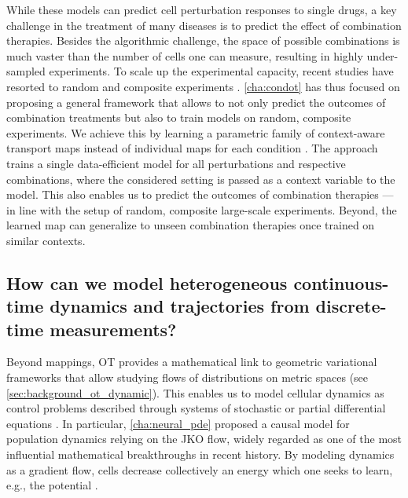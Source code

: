  While these models can predict cell perturbation responses to single drugs, a key challenge in the treatment of many diseases is to predict the effect of combination therapies. Besides the algorithmic challenge, the space of possible combinations is much vaster than the number of cells one can measure, resulting in highly under-sampled experiments. To scale up the experimental capacity, recent studies have resorted to random and composite experiments \citep{norman2019exploring, cleary2020necessity}.
\cref{cha:condot} has thus focused on proposing a general framework that allows to not only predict the outcomes of combination treatments but also to train models on random, composite experiments.
We achieve this by learning a parametric family of context-aware transport maps instead of individual maps for each condition \citep{bunne2022supervised}.
The approach trains a single data-efficient model for all perturbations and respective combinations, where the considered setting is passed as a context variable to the model. 
This also enables us to predict the outcomes of combination therapies ---in line with the setup of random, composite large-scale experiments.
Beyond, the learned map can generalize to unseen combination therapies once trained on similar contexts.


\subsection*{\textbf{How can we model heterogeneous continuous-time dynamics and trajectories from discrete-time measurements?}}

Beyond mappings, OT provides a mathematical link to geometric variational frameworks that allow studying flows of distributions on metric spaces (see \cref{sec:background_ot_dynamic}).
This enables us to model cellular dynamics as control problems described through systems of stochastic \citep[\cref{cha:neural_sde}]{bunne2022recovering, somnath2023aligned} or partial differential equations \citep[\cref{cha:neural_pde}]{bunne2022proximal}.
In particular, \cref{cha:neural_pde} proposed a causal model for population dynamics relying on the \acrfull{JKO} flow, widely regarded as one of the most influential mathematical breakthroughs in recent history. By modeling dynamics as a gradient flow, cells decrease collectively an energy which one seeks to learn, e.g., the \citeauthor{waddington1957strategy} potential \citep{bunne2022proximal}. 

